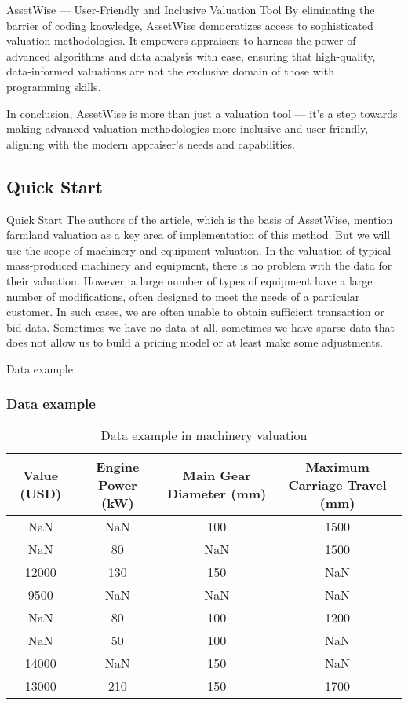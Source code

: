 \documentclass{beamer}
\begin{document}
\begin{frame}{AssetWise --- User-Friendly and Inclusive Valuation Tool}
    By eliminating the barrier of coding knowledge, AssetWise democratizes access to sophisticated valuation methodologies. It empowers appraisers to harness the power of advanced algorithms and data analysis with ease, ensuring that high-quality, data-informed valuations are not the exclusive domain of those with programming skills.

    In conclusion, AssetWise is more than just a valuation tool --- it's a step towards making advanced valuation methodologies more inclusive and user-friendly, aligning with the modern appraiser's needs and capabilities.
\end{frame}

\subsection{Quick Start}

\begin{frame}{Quick Start}
	The authors of the article, which is the basis of AssetWise, mention farmland valuation as a key area of implementation of this method. But we will use the scope of machinery and equipment valuation. In the valuation of typical mass-produced machinery and equipment, there is no problem with the data for their valuation. However, a large number of types of equipment have a large number of modifications, often designed to meet the needs of a particular customer. In such cases, we are often unable to obtain sufficient transaction or bid data. Sometimes we have no data at all, sometimes we have sparse data that does not allow us to build a pricing model or at least make some adjustments. 
\end{frame}

\begin{frame}{Data example}
	\frametitle{Data example}
	
	\begin{table}[h!]
		\centering
		\begin{tabular}{|c|c|c|c|}
			\hline
			{\tiny Value (USD)} & {\tiny Engine Power (kW)} & {\tiny Main Gear Diameter (mm)} & {\tiny Maximum Carriage Travel (mm)} \\
			\hline
			NaN & NaN & 100 & 1500 \\
			NaN & 80 & NaN & 1500 \\
			12000 & 130 & 150 & NaN \\
			9500 & NaN & NaN & NaN \\
			NaN & 80 & 100 & 1200 \\
			NaN & 50 & 100 & NaN \\
			14000 & NaN & 150 & NaN \\
			13000 & 210 & 150 & 1700 \\
			\hline
		\end{tabular}
		\caption{Data example in machinery valuation}
	\end{table}
\end{frame}
\end{document}
